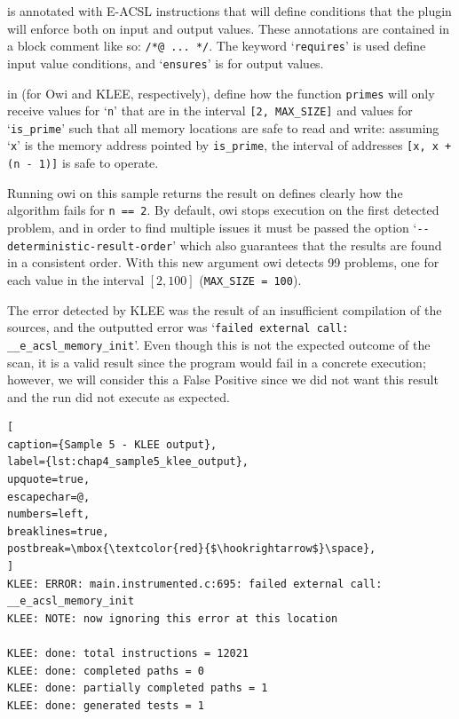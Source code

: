  is annotated with E-ACSL instructions that will define conditions that the plugin will enforce both on input and output values. These annotations are contained in a block comment like so: \lstinline$/*@ ... */$. The keyword `\lstinline$requires$' is used define input value conditions, and `\lstinline$ensures$' is for output values. 

 in  (for Owi and KLEE, respectively), define how the function \lstinline$primes$ will only receive values for `\lstinline$n$' that are in the interval \lstinline$[2, MAX_SIZE]$ and values for `\lstinline$is_prime$' such that all memory locations are safe to read and write: assuming `\lstinline$x$' is the memory address pointed by \lstinline$is_prime$, the interval of addresses \lstinline$[x, x + (n - 1)]$ is safe to operate.

Running owi on this sample returns the result on  defines clearly how the algorithm fails for \lstinline$n == 2$. By default, owi stops execution on the first detected problem, and in order to find multiple issues it must be passed the option `\lstinline$--deterministic-result-order$' which also guarantees that the results are found in a consistent order. With this new argument owi detects 99 problems, one for each value in the interval $[2, 100]$ (\lstinline$MAX_SIZE = 100$).

The error detected by KLEE was the result of an insufficient compilation of the sources, and the outputted error was `\lstinline$failed external call: __e_acsl_memory_init$'. Even though this is not the expected outcome of the scan, it is a valid result since the program would fail in a concrete execution; however, we will consider this a False Positive since we did not want this result and the run did not execute as expected.

\begin{lstlisting}[
caption={Sample 5 - KLEE output},
label={lst:chap4_sample5_klee_output},
upquote=true,
escapechar=@,
numbers=left,
breaklines=true,
postbreak=\mbox{\textcolor{red}{$\hookrightarrow$}\space},
]
KLEE: ERROR: main.instrumented.c:695: failed external call: __e_acsl_memory_init
KLEE: NOTE: now ignoring this error at this location

KLEE: done: total instructions = 12021
KLEE: done: completed paths = 0
KLEE: done: partially completed paths = 1
KLEE: done: generated tests = 1
\end{lstlisting}

